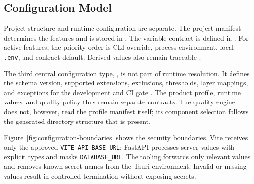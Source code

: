 \subsection{Configuration Model}
\label{subsec:konfigurationsmodell}

Project structure and runtime configuration are separate. The project manifest
determines the features and is stored in . The
variable contract is defined in . For active
features, the priority order is CLI override, process environment, local
\texttt{.env}, and contract default. Derived values also remain traceable
\parencite{kleiveist2026configuration}.

The third central configuration type, , is not
part of runtime resolution. It defines the schema version, supported
extensions, exclusions, thresholds, layer mappings, and exceptions for the
development and CI gate \parencite{kleiveist2026quality-config}. The product
profile, runtime values, and quality policy thus remain separate contracts.
The quality engine does not, however, read the profile manifest itself; its
component selection follows the generated directory structure that is present.

Figure~\ref{fig:configuration-boundaries} shows the security boundaries. Vite
receives only the approved \texttt{VITE\_API\_BASE\_URL}; FastAPI processes
server values with explicit types and masks \texttt{DATABASE\_URL}. The tooling
forwards only relevant values and removes known secret names from the Tauri
environment. Invalid or missing values result in controlled termination without
exposing secrets.


